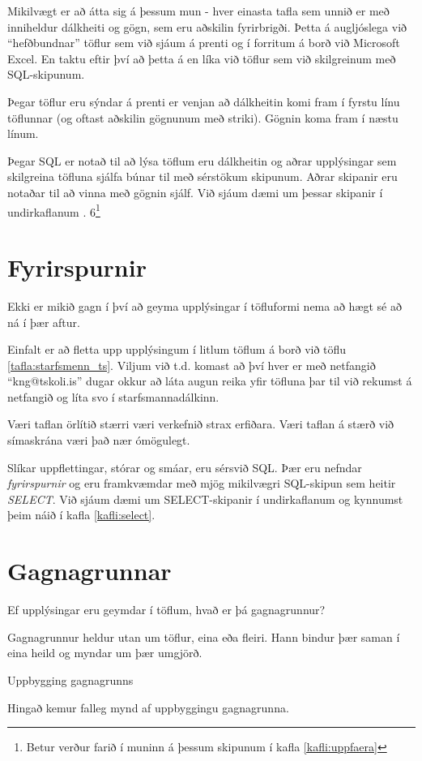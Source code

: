 Mikilvægt er að átta sig á þessum mun - hver einasta tafla sem unnið er með inniheldur dálkheiti og gögn, sem eru aðskilin fyrirbrigði. Þetta á augljóslega við ``hefðbundnar'' töflur sem við sjáum á prenti og í forritum á borð við Microsoft Excel. En taktu eftir því að þetta á en líka við töflur sem við skilgreinum með SQL-skipunum.

Þegar töflur eru sýndar á prenti er venjan að dálkheitin komi fram í fyrstu línu töflunnar (og oftast aðskilin gögnunum með striki). Gögnin koma fram í næstu línum.

Þegar SQL er notað til að lýsa töflum eru dálkheitin og aðrar upplýsingar sem skilgreina töfluna sjálfa búnar til með sérstökum skipunum. Aðrar skipanir eru notaðar til að vinna með gögnin sjálf. Við sjáum dæmi um þessar skipanir í undirkaflanum . 6\footnote{Betur verður farið í muninn á þessum skipunum í kafla \ref{kafli:uppfaera}}
\section{Fyrirspurnir}
Ekki er mikið gagn í því að geyma upplýsingar í töfluformi nema að hægt sé að ná í þær aftur.

Einfalt er að fletta upp upplýsingum í litlum töflum á borð við töflu \ref{tafla:starfsmenn_ts}. Viljum við t.d. komast að því hver er með netfangið ``kng@tskoli.is'' dugar okkur að láta augun reika yfir töfluna þar til við rekumst á netfangið og líta svo í starfsmannadálkinn.

Væri taflan örlítið stærri væri verkefnið strax erfiðara. Væri taflan á stærð við símaskrána væri það nær ómögulegt.

Slíkar uppflettingar, stórar og smáar, eru sérsvið SQL. Þær eru nefndar \emph{fyrirspurnir} og eru framkvæmdar með mjög mikilvægri SQL-skipun sem heitir \emph{SELECT}. Við sjáum dæmi um SELECT-skipanir í undirkaflanum  og kynnumst þeim náið í kafla \ref{kafli:select}.
\section{Gagnagrunnar}
Ef upplýsingar eru geymdar í töflum, hvað er þá gagnagrunnur?

Gagnagrunnur heldur utan um töflur, eina eða fleiri. Hann bindur þær saman í eina heild og myndar um þær umgjörð.
\begin{marginfigure}
\centering
\caption{Uppbygging gagnagrunns}
\label{mynd:uppbygging}
\color{red} Hingað kemur falleg mynd af uppbyggingu gagnagrunna.
\end{marginfigure}

